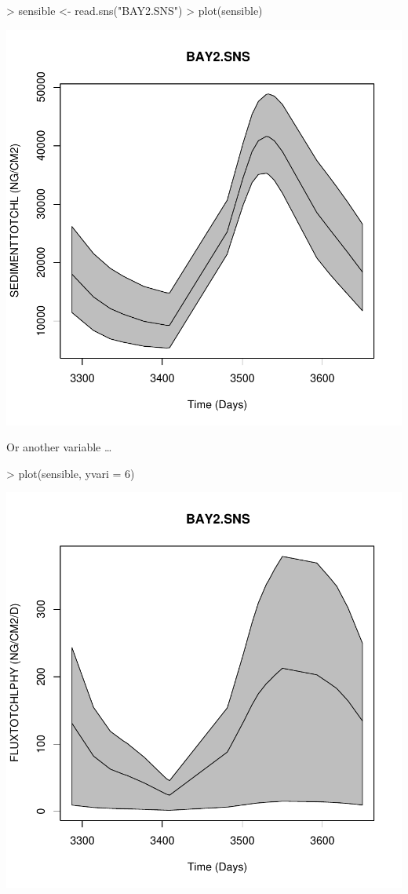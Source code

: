 \documentclass{scrartcl}
\begin{document}
\begin{Schunk}
\begin{Sinput}
> sensible <- read.sns("BAY2.SNS")
> plot(sensible)
\end{Sinput}
\end{Schunk}
\includegraphics{figures/f-sns}

Or another variable \ldots

\begin{Schunk}
\begin{Sinput}
> plot(sensible, yvari = 6)
\end{Sinput}
\end{Schunk}
\includegraphics{figures/f-sns2}
\end{document}
